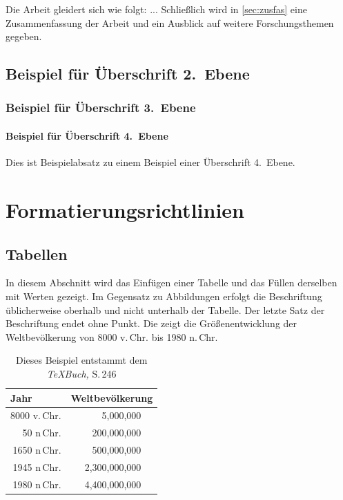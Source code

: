 \documentclass[runningheads,a4paper]{llncs}[2022/01/12]
\begin{document}
Die Arbeit gleidert sich wie folgt:
...
Schließlich wird in \cref{sec:zusfas} eine Zusammenfassung der Arbeit und ein Ausblick auf weitere Forschungsthemen gegeben.

\subsection{Beispiel für Überschrift 2.~Ebene}

\subsubsection{Beispiel für Überschrift 3.~Ebene}

\paragraph{Beispiel für Überschrift 4.~Ebene}
Dies ist Beispielabsatz zu einem Beispiel einer Überschrift 4.~Ebene.

\section{Formatierungsrichtlinien}

\subsection{Tabellen}
In diesem Abschnitt wird das Einfügen einer Tabelle und das Füllen derselben mit Werten gezeigt.
Im Gegensatz zu Abbildungen erfolgt die Beschriftung üblicherweise oberhalb und nicht unterhalb der Tabelle.
Der letzte Satz der Beschriftung endet ohne Punkt.
Die  zeigt die Größenentwicklung der Weltbevölkerung von 8000 v.\,Chr. bis 1980 n.\,Chr.

\begin{table}
\caption{Dieses Beispiel entstammt dem {\it\TeX{}Buch,} S.\,246}
\label{tab:bsp}
\begin{center}
\begin{tabular}{r@{\quad}rl}
\hline
\multicolumn{1}{l}{\rule{0pt}{12pt}
                   Jahr}&\multicolumn{2}{l}{Weltbevölkerung}\\[2pt]
\hline\rule{0pt}{12pt}
8000 v.\,Chr. &     5,000,000& \\
  50 n\,Chr. &   200,000,000& \\
1650 n\,Chr. &   500,000,000& \\
1945 n\,Chr. & 2,300,000,000& \\
1980 n\,Chr. & 4,400,000,000& \\[2pt]
\hline
\end{tabular}
\end{center}
\end{table}
\end{document}
